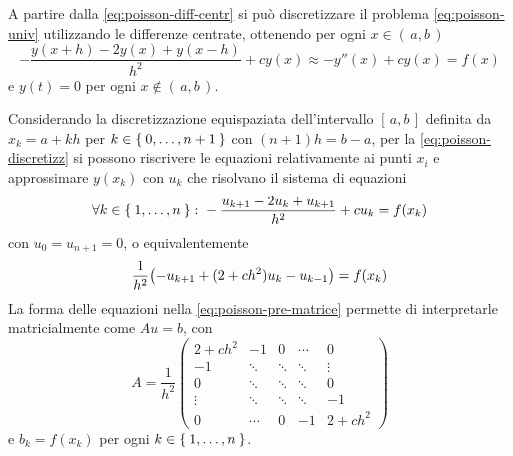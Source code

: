 	A partire dalla \eqref{eq:poisson-diff-centr} si può discretizzare il problema \eqref{eq:poisson-univ} utilizzando le differenze centrate, ottenendo per ogni \(x \in (\, a, b \,)\)
	\begin{equation}\label{eq:poisson-discretizz}
		- \frac{y (x + h) - 2 y (x) + y (x - h)}{h^2} + c y (x) \approx - y'' (x) + c y (x) = f (x)
	\end{equation}
	e \(y (t) = 0\) per ogni \(x \notin (\, a, b \,)\).
	
	Considerando la discretizzazione equispaziata dell'intervallo \([\, a, b \,]\) definita da \(x_k = a + k h\) per \(k \in \Set{0, \dots, n + 1}\) con \((n + 1) h = b - a\), per la \eqref{eq:poisson-discretizz} si possono riscrivere le equazioni relativamente ai punti \(x_i\) e approssimare \(y (x_k)\) con \(u_k\) che risolvano il sistema di equazioni
	\begin{equation*}
		\forall k \in \Set{1, \dots, n} \colon - \frac{u_{k + 1} - 2 u_k + u_{k + 1}}{h^2} + c u_k = f (x_k)
	\end{equation*}
	con \(u_0 = u_{n + 1} = 0\), o equivalentemente
	\begin{equation}\label{eq:poisson-pre-matrice}
		\frac{1}{h^2} \qty(- u_{k + 1} + (2 + c h^2) u_k - u_{k - 1}) = f (x_k)
	\end{equation}
	La forma delle equazioni nella \eqref{eq:poisson-pre-matrice} permette di interpretarle matricialmente come \(A u = b\), con
	\begin{equation}\label{eq:poisson-matrice}
		A = \frac{1}{h^2}
		\begin{pmatrix}
			2 + c h^2 & - 1    & 0      & \cdots & 0         \\
			- 1       & \ddots & \ddots & \ddots & \vdots    \\
			0         & \ddots & \ddots & \ddots & 0         \\
			\vdots    & \ddots & \ddots & \ddots & -1        \\
			0         & \cdots & 0      & -1     & 2 + c h^2
		\end{pmatrix}
	\end{equation}
	e \(b_k = f (x_k)\) per ogni \(k \in \Set{1, \dots, n}\).
	
